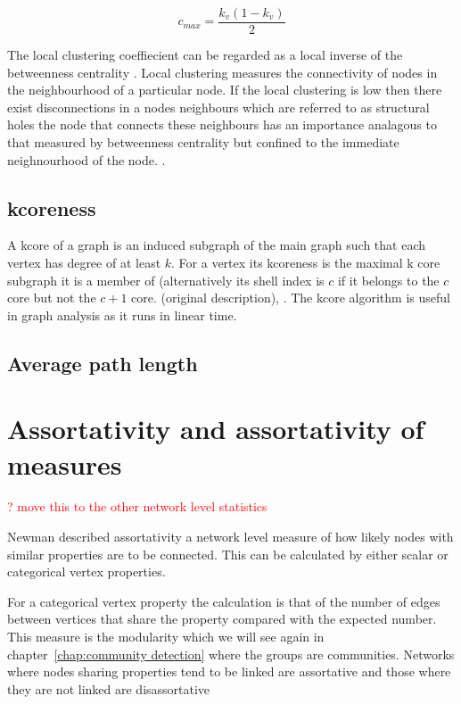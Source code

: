 \begin{equation}
c_{max} = \frac{k_v(1-k_v)}{2}
\end{equation}

The local clustering coeffiecient can be regarded as a local inverse of the betweenness centrality . Local clustering measures the connectivity of nodes in the neighbourhood of a particular node. If the local clustering is low then there exist disconnections in a nodes neighbours which are referred to as structural holes  the node that connects these neighbours has an importance analagous to that measured by betweenness centrality but confined to the immediate neighnourhood of the node. .






\subsection{kcoreness}

A kcore of a graph is an induced subgraph of the main graph such that each vertex has degree of at least $k$. For a vertex its kcoreness is the maximal k core subgraph it is a member of (alternatively its shell index is $c$ if it belongs to the $c$ core but not the $c+1$ core. \cite{seidman1983network} (original description), \cite{alvarez2006large}. The kcore algorithm is useful in graph analysis as it runs in linear time. 

\subsection{Average path length}
\label{sec:Centrality intro average path length}

\section{Assortativity and assortativity of measures}
\label{sec:assortativity}
\textcolor{red}{? move this to the other network level statistics}

Newman described assortativity a network level measure of how likely nodes with similar properties are to be connected. \cite{newman2002assortative} This can be calculated by either scalar or categorical vertex properties.

For a categorical vertex property the calculation is that of the number of edges between vertices that share the property compared with the expected number. This measure is the modularity which we will see again in chapter~\ref{chap:community detection} where the groups are communities. Networks where nodes sharing properties tend to be linked are assortative and those where they are not linked are disassortative

